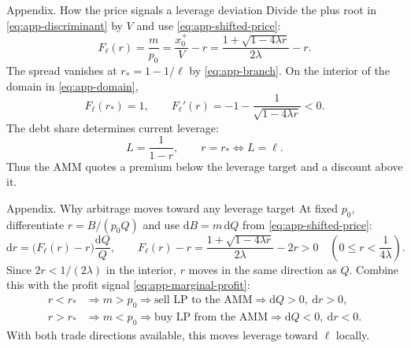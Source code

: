 \documentclass[aspectratio=169,11pt]{beamer}
\begin{document}
\begin{frame}{Appendix. How the price signals a leverage deviation}
  Divide the plus root in \eqref{eq:app-discriminant} by $V$ and use
  \eqref{eq:app-shifted-price}:
  \begin{equation}\label{eq:app-normalized-quote}
    F_\ell(r)=\frac{m}{p_0}=\frac{x_0^+}{V}-r
    =\frac{1+\sqrt{1-4\lambda r}}{2\lambda}-r.
  \end{equation}
  The spread vanishes at $r_*=1-1/\ell$ by \eqref{eq:app-branch}.
  On the interior of the domain in \eqref{eq:app-domain},
  \begin{equation}\label{eq:app-monotonicity}
    F_\ell(r_*)=1,\qquad
    F_\ell'(r)=-1-\frac{1}{\sqrt{1-4\lambda r}}<0.
  \end{equation}
  The debt share determines current leverage:
  \begin{equation}\label{eq:app-leverage-from-debt}
    L=\frac1{1-r},\qquad r=r_* \Longleftrightarrow L=\ell.
  \end{equation}
  Thus the AMM quotes a premium below the leverage target and a discount above it.
\end{frame}

\begin{frame}{Appendix. Why arbitrage moves toward any leverage target}
  At fixed $p_0$, differentiate $r=B/(p_0Q)$ and use
  $\mathrm dB=m\,\mathrm dQ$ from \eqref{eq:app-shifted-price}:
  \begin{equation}\label{eq:app-phase}
    \mathrm dr=\bigl(F_\ell(r)-r\bigr)\frac{\mathrm dQ}{Q},
    \qquad
    F_\ell(r)-r=\frac{1+\sqrt{1-4\lambda r}}{2\lambda}-2r>0
    \quad\left(0\le r<\frac1{4\lambda}\right).
  \end{equation}
  Since $2r<1/(2\lambda)$ in the interior, $r$ moves in the same direction
  as $Q$. Combine this with the profit signal \eqref{eq:app-marginal-profit}:
  \begin{align}
    r<r_* &\Longrightarrow m>p_0
    \Longrightarrow \text{sell LP to the AMM}
    \Longrightarrow \mathrm dQ>0,\ \mathrm dr>0,\label{eq:app-sell}\\
    r>r_* &\Longrightarrow m<p_0
    \Longrightarrow \text{buy LP from the AMM}
    \Longrightarrow \mathrm dQ<0,\ \mathrm dr<0.\label{eq:app-buy}
  \end{align}
  With both trade directions available, this moves leverage toward $\ell$ locally.
\end{frame}
\end{document}
